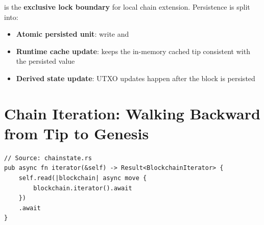 \begin{notebox}
 is the \textbf{exclusive lock boundary} for local chain extension. Persistence is split into:
\begin{itemize}
  \item \textbf{Atomic persisted unit}: write  and 
  \item \textbf{Runtime cache update}:  keeps the in-memory cached tip consistent with the persisted value
  \item \textbf{Derived state update}: UTXO updates happen after the block is persisted
\end{itemize}
\end{notebox}

\section{Chain Iteration: Walking Backward from Tip to Genesis}
\label{sec:ch09-3-iteration}

\begin{listing}[H]
\caption{Iterator entry point (shared lock)}
\label{lst:ch09-3-15}
\begin{verbatim}
// Source: chainstate.rs
pub async fn iterator(&self) -> Result<BlockchainIterator> {
    self.read(|blockchain| async move {
        blockchain.iterator().await
    })
    .await
}
\end{verbatim}
\end{listing}

